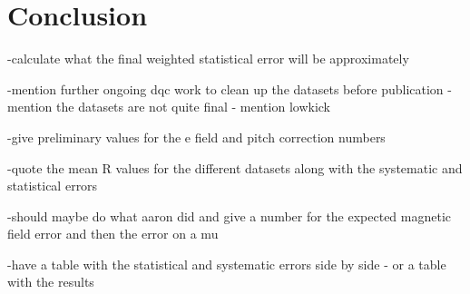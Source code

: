 
\thispagestyle{myheadings} %

\chapter{Conclusion}
\label{chapter:Conclusion}



-calculate what the final weighted statistical error will be approximately

-mention further ongoing dqc work to clean up the datasets before publication
-mention the datasets are not quite final - mention lowkick

-give preliminary values for the e field and pitch correction numbers

-quote the mean R values for the different datasets along with the systematic and statistical errors

-should maybe do what aaron did and give a number for the expected magnetic field error and then the error on a mu

-have a table with the statistical and systematic errors side by side - or a table with the results




